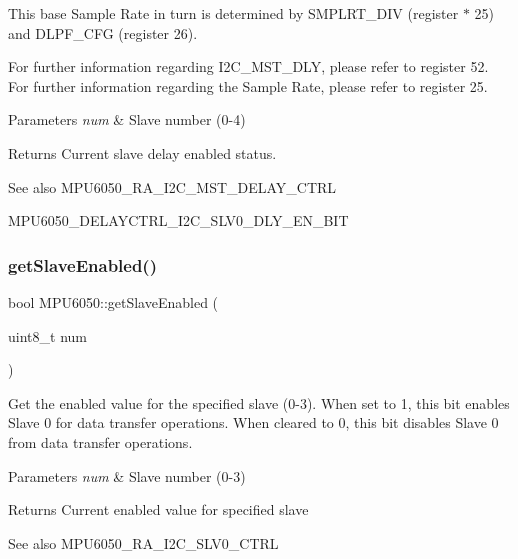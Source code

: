 This base Sample Rate in turn is determined by S\+M\+P\+L\+R\+T\+\_\+\+D\+IV (register $\ast$ 25) and D\+L\+P\+F\+\_\+\+C\+FG (register 26).

For further information regarding I2\+C\+\_\+\+M\+S\+T\+\_\+\+D\+LY, please refer to register 52. For further information regarding the Sample Rate, please refer to register 25.


\begin{DoxyParams}{Parameters}
{\em num} & Slave number (0-\/4) \\
\hline
\end{DoxyParams}
\begin{DoxyReturn}{Returns}
Current slave delay enabled status. 
\end{DoxyReturn}
\begin{DoxySeeAlso}{See also}
M\+P\+U6050\+\_\+\+R\+A\+\_\+\+I2\+C\+\_\+\+M\+S\+T\+\_\+\+D\+E\+L\+A\+Y\+\_\+\+C\+T\+RL 

M\+P\+U6050\+\_\+\+D\+E\+L\+A\+Y\+C\+T\+R\+L\+\_\+\+I2\+C\+\_\+\+S\+L\+V0\+\_\+\+D\+L\+Y\+\_\+\+E\+N\+\_\+\+B\+IT 
\end{DoxySeeAlso}
\mbox{\label{class_m_p_u6050_a5f14bde83fe00b27dec6776fc44e89c2}} 
\subsubsection{\texorpdfstring{getSlaveEnabled()}{getSlaveEnabled()}}
{\footnotesize\ttfamily bool M\+P\+U6050\+::get\+Slave\+Enabled (\begin{DoxyParamCaption}\item[{uint8\+\_\+t}]{num }\end{DoxyParamCaption})}

Get the enabled value for the specified slave (0-\/3). When set to 1, this bit enables Slave 0 for data transfer operations. When cleared to 0, this bit disables Slave 0 from data transfer operations. 
\begin{DoxyParams}{Parameters}
{\em num} & Slave number (0-\/3) \\
\hline
\end{DoxyParams}
\begin{DoxyReturn}{Returns}
Current enabled value for specified slave 
\end{DoxyReturn}
\begin{DoxySeeAlso}{See also}
M\+P\+U6050\+\_\+\+R\+A\+\_\+\+I2\+C\+\_\+\+S\+L\+V0\+\_\+\+C\+T\+RL 
\end{DoxySeeAlso}
\mbox{\label{class_m_p_u6050_a6b3c3aab80fcaa384303f9df2a59d7eb}} 
